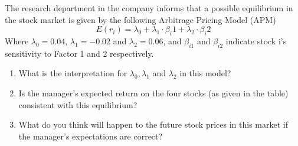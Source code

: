 \documentclass[12]{article}
\begin{document}
\noindent

\noindent
The research department in the company informs that a possible equilibrium in the stock market is given by the following Arbitrage Pricing Model (APM)
\begin{equation*}
    E(r_i) = \lambda_0 + \lambda_1\cdot \beta_i1 + \lambda_2\cdot \beta_i2
\end{equation*}
Where $\lambda_0 = 0.04$, $\lambda_1 = -0.02$ and $\lambda_2 = 0.06$, and $\beta_{i1}$ and $\beta_{i2}$ indicate stock i's sensitivity to Factor 1 and 2 respectively.
\begin{enumerate}
    \item[d)] What is the interpretation for $\lambda_0, \lambda_1$ and $\lambda_2$ in this model?
    \item[e)] Is the manager's expected return on the four stocks (as given in the table) consistent with this equilibrium?
    \item[f)] What do you think will happen to the future stock prices in this market if the manager's expectations are correct?
\end{enumerate}


\color{blue}
\end{document}
